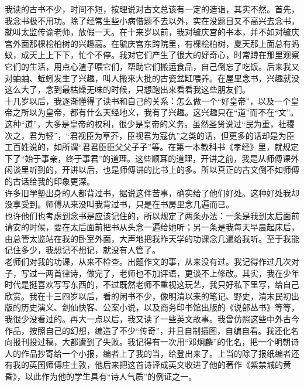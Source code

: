 我读的古书不少，时间不短，按理说对古文总该有一定的造诣，其实不然。首先，我念书极不用功。除了经常生些小病借题不去以外，实在没题目又不高兴去念书，就叫太监传谕老师，放假一天。在十来岁以前，我对毓庆宫的书本，并不如对毓庆宫外面那棵桧柏树的兴趣高。在毓庆宫东跨院里，有棵桧柏树，夏天那上面总有蚂蚁，成天上上下下，忙个不停。我对它们产生了很大的好奇心，时常蹲在那里观察它们的生活，用点心渣子喂它们，帮助它们搬运食品，自己倒忘了吃饭。后来我又对蛐蛐、蚯蚓发生了兴趣，叫人搬来大批的古瓷盆缸喂养。在屋里念书，兴趣就没这么大了，念到最枯燥无味的时候，只想跑出来看看我这些朋友们。\\

十几岁以后，我逐渐懂得了读书和自己的关系：怎么做一个“好皇帝”，以及一个皇帝之所以为皇帝，都有什么天经地义，我有了兴趣。这兴趣只在“道”而不在“文”。这种“道”，大多是皇帝的权利，很少是皇帝的义务。虽然圣贤说过“民为重，社稷次之，君为轻”，“君视臣为草芥，臣视君为寇仇”之类的话，但更多的话却是为臣工百姓说的，如所谓“君君臣臣父父子子”等。在第一本教科书《孝经》里，就规定下了“始于事亲，终于事君”的道理。这些顺耳的道理，开讲之前，我是从师傅课外闲谈里听到的，开讲以后，也是师傅讲的比书上的多。所以真正的古文倒不如师傅的古话给我的印象更深。\\

许多旧学塾出身的人都背过书，据说这件苦事，确实给了他们好处。这种好处我却没享受到。师傅从来没叫我背过书，只是在书房里念几遍而已。\\

也许他们也考虑到念书是应该记住的，所以规定了两条办法：一条是我到太后面前请安的时候，要在太后面前把书从头念一遍给她听；另一条是我每天早晨起床后，由总管太监站在我的卧室外面，大声地把我昨天学的功课念几遍给我听。至于我能记住多少，我想记不想记，就没有人管了。\\

老师们对我的功课，从来不检查。出题作文的事，从来没有过。我记得作过几次对子，写过一两首律诗，做完了，老师也不加评语，更谈不上修改。其实，我在少年时代是挺喜欢写写东西的，不过既然老师不重视这玩艺，我只好私下里写，给自己欣赏。我在十三四岁以后，看的闲书不少，像明清以来的笔记、野史，清末民初出版的历史演义、剑仙快客、公案小说，以及商务印书馆出版的《说部丛书》等等，我很少没看过的。再大一点以后，我又读了一些英文故事。我曾仿照这些中外古今作品，按照自己的幻想，编造了不少“传奇”，并且自制插图，自编自看。我还化名向报刊投过稿，大都遭到了失败。我记得有一次用“邓炯麟”的化名，把一个明朝诗人的作品抄寄给一个小报，编者上了我的当，给登出来了。上当的除了报纸编者还有我的英国师傅庄士敦，他后来把这首诗译成英文收进了他的著作《紫禁城的黄昏》，以此作为他的学生具有“诗人气质”的例证之一。\\

